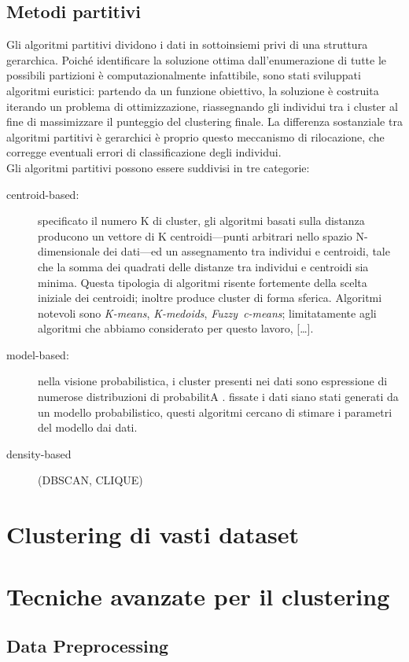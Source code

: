 \subsection{Metodi partitivi}
Gli algoritmi partitivi dividono i dati in sottoinsiemi privi di una struttura gerarchica. Poich\'e identificare la soluzione ottima dall'enumerazione di tutte le possibili partizioni \`e computazionalmente infattibile, sono stati sviluppati algoritmi euristici: partendo da un funzione obiettivo, la soluzione \`e costruita iterando un problema di ottimizzazione, riassegnando gli individui tra i cluster al fine di massimizzare il punteggio del clustering finale. La differenza sostanziale tra algoritmi partitivi \`e gerarchici \`e proprio questo meccanismo di rilocazione, che corregge eventuali errori di classificazione degli individui.\\
Gli algoritmi partitivi possono essere suddivisi in tre categorie:
\begin{description}
\item[centroid-based:] specificato il numero K di cluster, gli algoritmi basati sulla distanza producono un vettore di K centroidi---punti arbitrari nello spazio N-dimensionale dei dati---ed un assegnamento tra individui e centroidi, tale che la somma dei quadrati delle distanze tra individui e centroidi sia minima. Questa tipologia di algoritmi risente fortemente della scelta iniziale dei centroidi; inoltre produce cluster di forma sferica. Algoritmi notevoli sono \mbox{\textit{K-means}}, \mbox{\textit{K-medoids}}, \mbox{\textit{Fuzzy c-means}}; limitatamente agli algoritmi che abbiamo considerato per questo lavoro, [\dots].
\item[model-based:] nella visione probabilistica, i cluster presenti nei dati sono espressione di numerose distribuzioni di probabilitA . fissate i dati siano stati generati da un modello probabilistico, questi algoritmi cercano di stimare i parametri del modello dai dati.
\item[density-based] (DBSCAN, CLIQUE)
\end{description}
\section{Clustering di vasti dataset}

\section{Tecniche avanzate per il clustering}
\subsection{Data Preprocessing}
